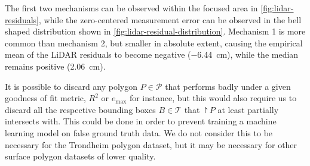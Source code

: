 The first two mechanisms can be observed within the focused area in \cref{fig:lidar-residuals}, while the zero-centered measurement error can be observed in the bell shaped distribution shown in \cref{fig:lidar-residual-distribution}.
Mechanism 1 is more common than mechanism 2, but smaller in absolute extent, causing the empirical mean of the LiDAR residuals to become negative (\SI{-6.44}{\centi\meter}), while the median remains positive (\SI{2.06}{\centi\meter}).

It is possible to discard any polygon $P \in \mathcal{P}$ that performs badly under a given goodness of fit metric, $R^2$ or $e_{\mathrm{\max}}$ for instance, but this would also require us to discard all the respective bounding boxes $B \in \mathcal{T}$ that $\project{P}$ at least partially intersects with.
This could be done in order to prevent training a machine learning model on false ground truth data.
We do not consider this to be necessary for the Trondheim polygon dataset, but it may be necessary for other surface polygon datasets of lower quality.
%
%
